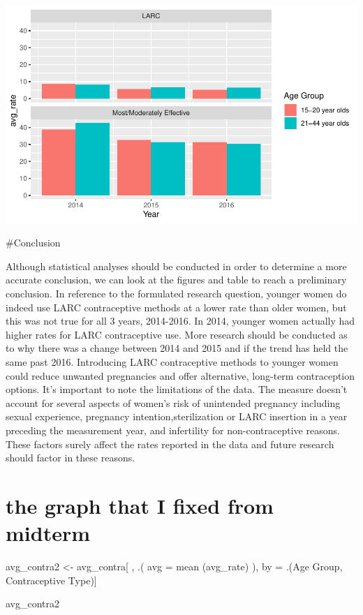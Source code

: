 \documentclass[
]{article}
\newenvironment{Shaded}{\begin{snugshade}}{\end{snugshade}}
\newcommand{\AttributeTok}[1]{\textcolor[rgb]{0.77,0.63,0.00}{#1}}
\newcommand{\FunctionTok}[1]{\textcolor[rgb]{0.00,0.00,0.00}{#1}}
\newcommand{\NormalTok}[1]{#1}
\newcommand{\OtherTok}[1]{\textcolor[rgb]{0.56,0.35,0.01}{#1}}
\newcommand{\StringTok}[1]{\textcolor[rgb]{0.31,0.60,0.02}{#1}}
\begin{document}
\begin{center}\includegraphics[width=700px]{Report_files/figure-latex/unnamed-chunk-11-1} \end{center}

\#Conclusion

Although statistical analyses should be conducted in order to determine
a more accurate conclusion, we can look at the figures and table to
reach a preliminary conclusion. In reference to the formulated research
question, younger women do indeed use LARC contraceptive methods at a
lower rate than older women, but this was not true for all 3 years,
2014-2016. In 2014, younger women actually had higher rates for LARC
contraceptive use. More research should be conducted as to why there was
a change between 2014 and 2015 and if the trend has held the same past
2016. Introducing LARC contraceptive methods to younger women could
reduce unwanted pregnancies and offer alternative, long-term
contraception options. It's important to note the limitations of the
data. The measure doesn't account for several aspects of women's risk of
unintended pregnancy including sexual experience, pregnancy
intention,sterilization or LARC insertion in a year preceding the
measurement year, and infertility for non-contraceptive reasons. These
factors surely affect the rates reported in the data and future research
should factor in these reasons.

\hypertarget{the-graph-that-i-fixed-from-midterm}{%
\section{the graph that I fixed from
midterm}\label{the-graph-that-i-fixed-from-midterm}}

\begin{Shaded}
\begin{Highlighting}[]
\NormalTok{avg\_contra2 }\OtherTok{\textless{}{-}}\NormalTok{ avg\_contra[ , .(}
    \AttributeTok{avg =} \FunctionTok{mean}\NormalTok{ (avg\_rate)}
\NormalTok{  ), }
\NormalTok{  by }\OtherTok{=}\NormalTok{ .(}\StringTok{\textasciigrave{}}\AttributeTok{Age Group}\StringTok{\textasciigrave{}}\NormalTok{, }\StringTok{\textasciigrave{}}\AttributeTok{Contraceptive Type}\StringTok{\textasciigrave{}}\NormalTok{)]}

\NormalTok{avg\_contra2}
\end{Highlighting}
\end{Shaded}
\end{document}
